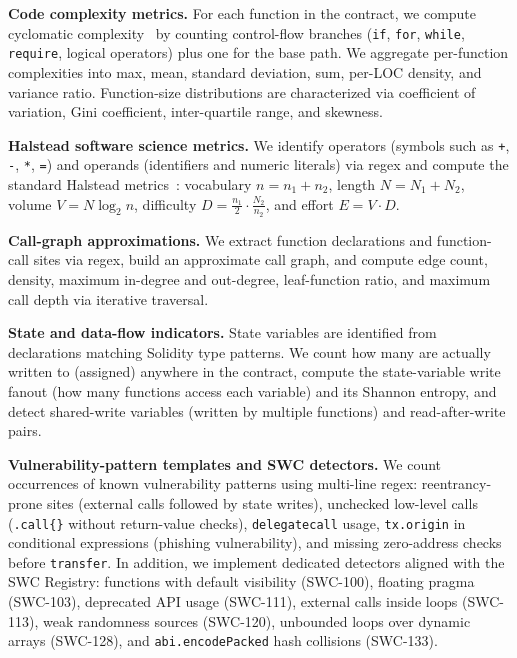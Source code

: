 \documentclass[11pt,a4paper]{article}
\begin{document}
\textbf{Code complexity metrics.}
For each function in the contract, we compute cyclomatic complexity~\cite{mccabe1976complexity} by counting control-flow branches (\texttt{if}, \texttt{for}, \texttt{while}, \texttt{require}, logical operators) plus one for the base path.
We aggregate per-function complexities into max, mean, standard deviation, sum, per-LOC density, and variance ratio.
Function-size distributions are characterized via coefficient of variation, Gini coefficient, inter-quartile range, and skewness.

\textbf{Halstead software science metrics.}
We identify operators (symbols such as \texttt{+}, \texttt{-}, \texttt{*}, \texttt{=}) and operands (identifiers and numeric literals) via regex and compute the standard Halstead metrics~\cite{halstead1977elements}: vocabulary $n = n_1 + n_2$, length $N = N_1 + N_2$, volume $V = N \log_2 n$, difficulty $D = \frac{n_1}{2} \cdot \frac{N_2}{n_2}$, and effort $E = V \cdot D$.

\textbf{Call-graph approximations.}
We extract function declarations and function-call sites via regex, build an approximate call graph, and compute edge count, density, maximum in-degree and out-degree, leaf-function ratio, and maximum call depth via iterative traversal.

\textbf{State and data-flow indicators.}
State variables are identified from declarations matching Solidity type patterns.
We count how many are actually written to (assigned) anywhere in the contract, compute the state-variable write fanout (how many functions access each variable) and its Shannon entropy, and detect shared-write variables (written by multiple functions) and read-after-write pairs.

\textbf{Vulnerability-pattern templates and SWC detectors.}
We count occurrences of known vulnerability patterns using multi-line regex: reentrancy-prone sites (external calls followed by state writes), unchecked low-level calls (\texttt{.call\{\}} without return-value checks), \texttt{delegatecall} usage, \texttt{tx.origin} in conditional expressions (phishing vulnerability), and missing zero-address checks before \texttt{transfer}.
In addition, we implement dedicated detectors aligned with the SWC Registry: functions with default visibility (SWC-100), floating pragma (SWC-103), deprecated API usage (SWC-111), external calls inside loops (SWC-113), weak randomness sources (SWC-120), unbounded loops over dynamic arrays (SWC-128), and \texttt{abi.encodePacked} hash collisions (SWC-133).
\end{document}
